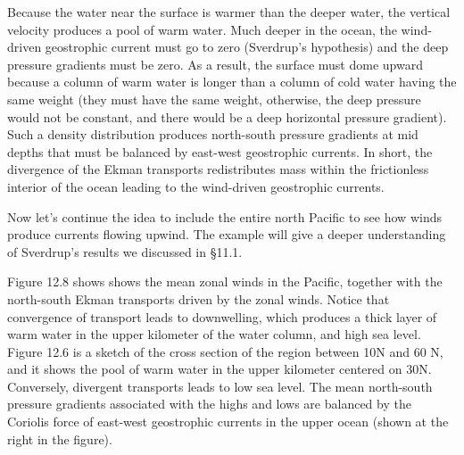 Because the water near the surface is warmer than the deeper water, the vertical
velocity produces a pool of warm water. Much deeper in the ocean, the wind-driven
geostrophic current must go to zero (Sverdrup's hypothesis) and the deep pressure
gradients must be zero. As a result, the surface must dome upward because a column
of warm water is longer than a column of cold water having the same weight (they
must have the same weight, otherwise, the deep pressure would not be constant, and
there would be a deep horizontal pressure gradient). Such a density distribution
produces north-south pressure gradients at mid depths that must be balanced by
east-west geostrophic currents. In short, the divergence of the Ekman
transports redistributes mass within the frictionless interior of the
ocean leading to the wind-driven geostrophic currents.

Now let's continue the idea to include the entire north Pacific to see how winds
produce currents flowing upwind. The example will give a deeper understanding of
Sverdrup's results we discussed in \S11.1.

Figure 12.8 shows shows the mean zonal winds in the Pacific, together with the
north-south Ekman transports driven by the zonal winds. Notice that
convergence of transport leads to downwelling, which produces a
thick layer of warm water in the upper kilometer of the water column, and high sea level.
Figure 12.6 is a sketch of the cross section of the region between 10\degrees N and 60\degrees
N, and it shows the pool of warm water in the upper kilometer centered on 30\degrees N.
Conversely, divergent transports leads to low sea level. The mean north-south
pressure gradients associated with the highs and lows are balanced by the Coriolis
force of east-west geostrophic currents in the upper
ocean (shown at the right in the figure).

